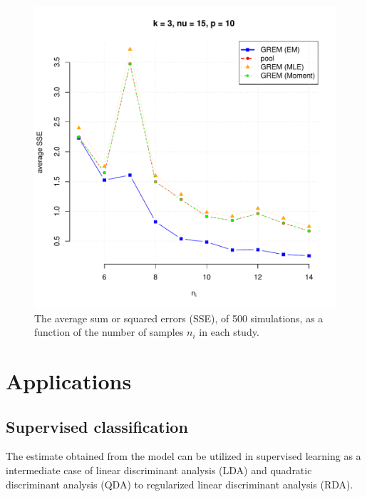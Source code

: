 \documentclass{article}\usepackage[]{graphicx}\usepackage[]{color}
\makeatletter
\def\maxwidth{ %
  \ifdim\Gin@nat@width>\linewidth
    \linewidth
  \else
    \Gin@nat@width
  \fi
}
\newenvironment{knitrout}{}{} %
\makeatother
\begin{document}
\begin{knitrout}\footnotesize
{}\color{fgcolor}\begin{figure}[ht]

\includegraphics[width=\maxwidth]{figure/num_exp_plot} \caption[]{The average sum or squared errors (SSE), of 500 simulations, as a function of the number of samples $n_i$ in each study.\label{fig:num_exp_plot}}
\end{figure}


\end{knitrout}


\section{Applications}
\subsection{Supervised classification}
The estimate obtained from the model can be utilized in supervised learning as a intermediate case of linear discriminant analysis (LDA) and quadratic discriminant analysis (QDA) to regularized linear discriminant analysis (RDA).
\end{document}
